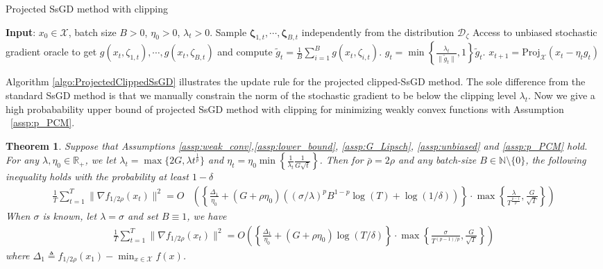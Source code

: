 \documentclass{article}
\newtheorem{theorem}{Theorem}
\def \X {\mathcal{X}}
\begin{document}
\begin{algorithm*}[t]
    \caption{Projected SsGD method with clipping}\label{algo:ProjectedClippedSsGD}
    \begin{algorithmic}[1]
       \STATE \textbf{Input}: $x_0 \in \X$, batch size $B>0$, $\eta_0>0$, $\lambda_t > 0$.
       \STATE Sample $\mathbf{\zeta}_{1,t},\cdots,\mathbf{\zeta}_{B,t}$ independently from the distribution $\mathcal{D}_\zeta$
       \STATE Access to unbiased stochastic gradient oracle to get $g(x_t,\zeta_{1,t}),\cdots, g(x_t,\zeta_{B,t})$ and compute $\widetilde{g}_t = \frac{1}{B}\sum_{i=1}^B g(x_t,\zeta_{i,t})$.
       \STATE $g_t = \min\left\{\frac{\lambda_t}{\|\tilde{g}_t\|},1\right\}\widetilde{g}_t$.
       \STATE $x_{t+1} = \mathrm{Proj}_\X (x_t - \eta_t g_t)$
       \ENDFOR
    \end{algorithmic}
\end{algorithm*}
Algorithm \ref{algo:ProjectedClippedSsGD} illustrates the update rule for the projected clipped-SsGD method. The sole difference from the standard SsGD method is that we manually constrain the norm of the stochastic gradient to be below the clipping level $\lambda_t$. Now we give a high probabability upper bound of projected SsGD method with clipping for minimizing weakly convex functions with Assumption ~\ref{assp:p_PCM}.
\begin{theorem}\label{thm:projected_ssgd_pcm_HPB_anytime}
    Suppose that Assumptions \ref{assp:weak_conv},\ref{assp:lower_bound}, \ref{assp:G_Lipsch}, \ref{assp:unbiased} and \ref{assp:p_PCM} hold. For any $\lambda,\eta_0\in\mathbb{R}_+$, we let $\lambda_t=\max\{2G,\lambda t^{\frac{1}{p}}\}$ and $\eta_t=\eta_0\min\left\{\frac{1}{\lambda_t}\frac{1}{G\sqrt{t}}\right\}$. Then for  $\bar{\rho}=2\rho$ and any batch-size $B\in\mathbb{N}\setminus\{0\}$, the following inequality holds with the probability at least $1-\delta$
    \begin{align}
    \frac{1}{T}\sum_{t=1}^T\|\nabla f_{1/2\rho}(x_t)\|^2 = 
        O&\left(\left\{\frac{\Delta_1}{\eta_0}+(G+\rho\eta_0)\left((\sigma/\lambda)^pB^{1-p}\log (T)+\log(1/\delta)\right)\right\}\cdot\max\left\{\frac{\lambda}{T^{\frac{p-1}{p}}},\frac{G}{\sqrt{T}}\right\}\right)
    \end{align}
When $\sigma$ is known, let $\lambda = \sigma$ and set $B\equiv1$, we have
\begin{align}
    \frac{1}{T}\sum_{t=1}^T\|\nabla f_{1/2\rho}(x_t)\|^2= O\left(\left\{\frac{\Delta_1}{\eta_0}+(G+\rho\eta_0)\log (T/\delta)\right\}\cdot\max\left\{\frac{\sigma}{T^{(p-1)/p}},\frac{G}{\sqrt{T}}\right\}\right)
\end{align}
where $\Delta_1\triangleq f_{1/2\rho}(x_1)-\min_{x\in\X} f(x)$.
\end{theorem}
\end{document}
